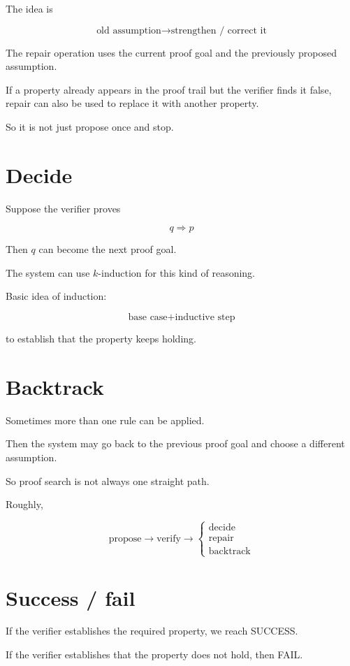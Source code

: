 \documentclass[11pt]{book}
\begin{document}
The idea is

\[
\text{old assumption}
\rightarrow
\text{strengthen / correct it}
\]

The repair operation uses the current proof goal
and the previously proposed assumption.

If a property already appears in the proof trail
but the verifier finds it false, repair can also
be used to replace it with another property.

So it is not just propose once and stop.

\section{Decide}

Suppose the verifier proves

\[
q\Rightarrow p
\]

Then $q$ can become the next proof goal.

The system can use $k$-induction for this kind of
reasoning.

Basic idea of induction:

\[
\text{base case}
+
\text{inductive step}
\]

to establish that the property keeps holding.

\section{Backtrack}

Sometimes more than one rule can be applied.

Then the system may go back to the previous proof goal
and choose a different assumption.

So proof search is not always one straight path.

Roughly,

\[
\text{propose}
\rightarrow
\text{verify}
\rightarrow
\begin{cases}
\text{decide}\\
\text{repair}\\
\text{backtrack}
\end{cases}
\]

\section{Success / fail}

If the verifier establishes the required property,
we reach SUCCESS.

If the verifier establishes that the property does
not hold, then FAIL.
\end{document}
